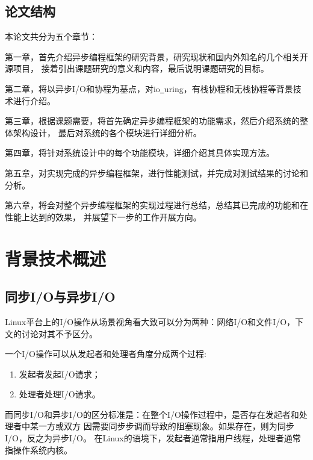 \documentclass[supercite]{HustGraduPaper}
\theoremstyle{definition}
\begin{document}
\subsection{论文结构}
本论文共分为五个章节：\par

第一章，首先介绍异步编程框架的研究背景，研究现状和国内外知名的几个相关开源项目，
接着引出课题研究的意义和内容，最后说明课题研究的目标。\par

第二章，将以异步I/O和协程为基点，对io\underline{~}uring，有栈协程和无栈协程等背景技术进行介绍。\par

第三章，根据课题需要，将首先确定异步编程框架的功能需求，然后介绍系统的整体架构设计，
最后对系统的各个模块进行详细分析。\par

第四章，将针对系统设计中的每个功能模块，详细介绍其具体实现方法。\par

第五章，对实现完成的异步编程框架，进行性能测试，并完成对测试结果的讨论和分析。\par

第六章，将会对整个异步编程框架的实现过程进行总结，总结其已完成的功能和在性能上达到的效果，
并展望下一步的工作开展方向。\par

\section{背景技术概述}
\subsection{同步I/O与异步I/O}
Linux平台上的I/O操作从场景视角看大致可以分为两种：网络I/O和文件I/O，下文的讨论对其不予区分。\par

一个I/O操作可以从发起者和处理者角度分成两个过程:
\begin{enumerate}
    \item 发起者发起I/O请求；
    \item 处理者处理I/O请求。
\end{enumerate}\par
而同步I/O和异步I/O的区分标准是：在整个I/O操作过程中，是否存在发起者和处理者中某一方或双方
因需要同步步调而导致的阻塞现象。如果存在，则为同步I/O，反之为异步I/O。
在Linux的语境下，发起者通常指用户线程，处理者通常指操作系统内核。\par
\end{document}
